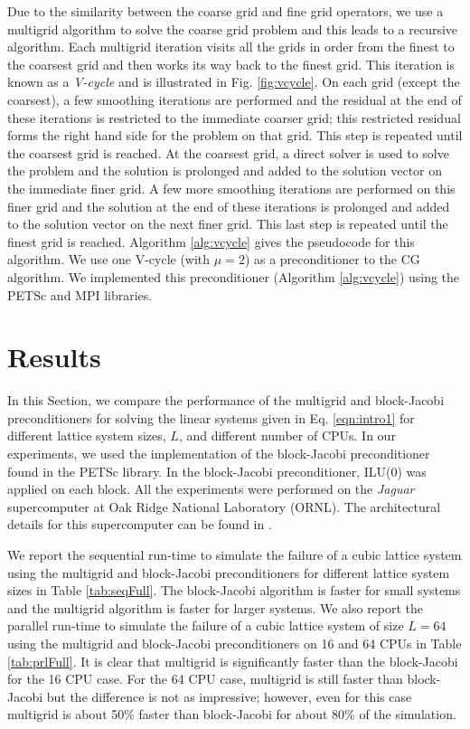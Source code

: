 \documentclass[11pt]{iopart}
\begin{document}
Due to the similarity between the coarse grid and fine grid operators, we
 use a multigrid algorithm to solve the coarse grid problem and this leads to a recursive algorithm. 
Each multigrid iteration visits all the grids in order from the finest to the coarsest grid and then works
 its way back to the finest grid. This iteration is known as a {\it{V-cycle}} and is illustrated in Fig. \ref{fig:vcycle}. 
 On each grid (except the coarsest), a few smoothing iterations are performed and
 the residual at the end of these iterations is restricted to the immediate coarser grid; this restricted residual
 forms the right hand side for the problem on that grid. This step is repeated until the
 coarsest grid is reached. At the coarsest grid, a direct solver is used to solve the problem and the solution is prolonged
  and added to the solution vector on the immediate finer grid. A few more smoothing iterations are performed on this finer grid 
  and the solution at the end of these iterations is prolonged and added to the solution vector on the next finer grid. This
  last step is repeated until the finest grid is reached. Algorithm \ref{alg:vcycle} gives the pseudocode for this algorithm. We 
  use one V-cycle (with $\mu = 2$) as a preconditioner to the CG algorithm.  We
 implemented this preconditioner (Algorithm \ref{alg:vcycle}) using the PETSc \cite{petsc-home-page, petsc-user-ref} 
 and MPI libraries.

\section{Results}
\label{sec:results}
In this Section, we compare the performance of the multigrid and block-Jacobi preconditioners for solving the linear systems given in Eq. \ref{eqn:intro1} for different lattice system sizes, $L$, 
and different number of CPUs. In our experiments, we used the implementation of the block-Jacobi 
preconditioner found in the PETSc library. In the block-Jacobi preconditioner, ILU(0) was applied on each block.
All the experiments were performed on the {\it{Jaguar}} supercomputer at Oak Ridge National Laboratory (ORNL). The
 architectural details for this supercomputer can be found in \cite{jaguar}.

We report the sequential run-time to simulate the failure of a cubic lattice system using 
  the multigrid and block-Jacobi preconditioners for different lattice 
  system sizes in Table \ref{tab:seqFull}. The block-Jacobi algorithm
  is faster for small systems and the multigrid algorithm is faster for larger systems. 
We also report the parallel run-time to simulate the failure of a cubic lattice system of size $L = 64$ using 
 the multigrid and block-Jacobi preconditioners on 16 and 64 CPUs in Table \ref{tab:prlFull}. It is clear that 
 multigrid is significantly faster than the block-Jacobi for the 16 CPU case. For the 64 CPU case, multigrid is still
 faster than block-Jacobi but the difference is not as impressive; however, even for this case multigrid is about 50\% 
 faster than block-Jacobi for about 80\% of the simulation. 
 
\end{document}
